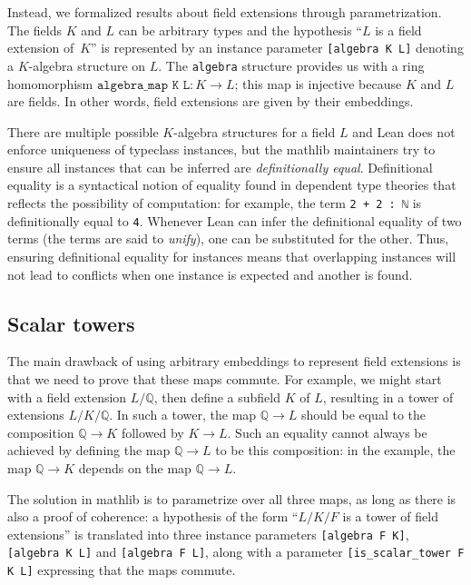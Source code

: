 \documentclass[sn-mathphys]{sn-jnl}%
\newcommand{\lean}[1]{\texttt{#1}\xspace}
\newcommand{\mathlib}{\textsf{mathlib}\xspace}
\newcommand{\QQ}{\mathbb{Q}}
\begin{document}
Instead, we formalized results about field extensions through parametrization. The fields $K$ and $L$ can be arbitrary types
and the hypothesis ``$L$ is a field extension of~$K$'' is represented by an instance parameter \lean{[algebra K L]} denoting a $K$-algebra structure on $L$.
The \lean{algebra} structure provides us with a ring homomorphism $\lean{algebra\_map K L} : K \to L$; this map is injective because $K$ and $L$ are fields.
In other words, field extensions are given by their embeddings.

There are multiple possible $K$-algebra structures for a field $L$ and Lean does not enforce uniqueness of typeclass instances,
but the \mathlib maintainers try to ensure all instances that can be inferred are \emph{definitionally equal}.
Definitional equality is a syntactical notion of equality found in dependent type theories that reflects the possibility of computation:
for example, the term \lean{2 + 2 : ℕ} is definitionally equal to \lean{4}.
Whenever Lean can infer the definitional equality of two terms (the terms are said to \emph{unify}),
one can be substituted for the other.
Thus, ensuring definitional equality for instances means that overlapping instances will not lead to conflicts when one instance is expected and another is found.

\subsection{Scalar towers} \label{sec:scalar_tower}

The main drawback of using arbitrary embeddings to represent field extensions is that we need to prove that these maps commute.
For example, we might start with a field extension $L / \QQ$, then define a subfield $K$ of $L$,
resulting in a tower of extensions $L / K / \QQ$.
In such a tower, the map $\QQ \to L$ should be equal to the composition $\QQ \to K$ followed by $K \to L$.
Such an equality cannot always be achieved by defining the map $\QQ \to L$ to be this composition: in the example, the map $\QQ \to K$ depends on the map $\QQ \to L$.

The solution in \mathlib is to parametrize over all three maps, as long as there is also a proof of coherence:
a hypothesis of the form ``$L / K / F$ is a tower of field extensions'' is translated into three instance parameters \lean{[algebra F K]}, \lean{[algebra K L]} and \lean{[algebra F L]},
along with a parameter \lean{[is\_scalar\_tower F K L]} expressing that the maps commute.
\end{document}
